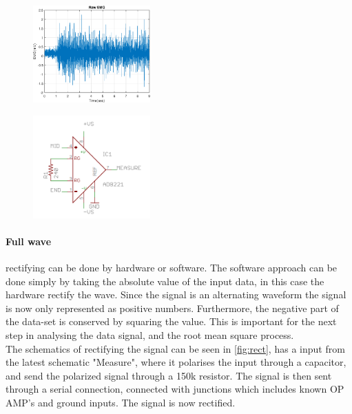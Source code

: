 \begin{multicols}{2}  
\begin{figure}[H]
    \centering
    \includegraphics[width=0.4\textwidth]{Figures/EMG/epsFigRAW}
    \caption{}
\end{figure} 
\columnbreak
\begin{figure}[H]
    \centering
    \includegraphics[width=0.4\textwidth]{Figures/EMG/AmpGB.PNG}
    \caption{\cite{SparkfunScematicEMG}}
    \label{fig:GainsEMG}
\end{figure} 
\end{multicols}

\paragraph{Full wave}
rectifying can be done by hardware or software. The software approach can be done simply by taking the absolute value \cite{RMS} of the input data, in this case the hardware rectify the wave. Since the signal is an alternating waveform the signal is now only represented as positive numbers. Furthermore, the negative part of the data-set is conserved by squaring the value. This is important for the next step in analysing the data signal, and the root mean square process.\\
The schematics of rectifying the signal can be seen in \ref{fig:rect}, has a input from the latest schematic "Measure", where it polarises the input through a capacitor, and send the polarized signal through a 150k resistor. The signal is then sent through a serial connection, connected with junctions which includes known OP AMP's and ground inputs. The signal is now rectified.\\

